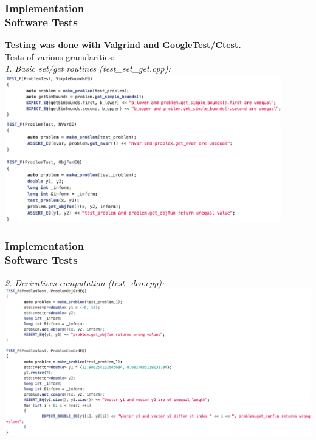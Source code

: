 \documentclass[ucs,10pt]{beamer}
\begin{document}
\begin{frame}
\frametitle{Implementation \\
\small \color{rwth-blue} Software Tests}
\textbf{Testing was done with Valgrind and GoogleTest/Ctest.}\vspace{2ex}\\
\underline{Tests of various granularities:}\vspace{1ex}\\
\textit{1. Basic set/get routines (test\_set\_get.cpp):}
\includegraphics[width=0.9\textwidth]{test1.1.png}
\includegraphics[width=0.9\textwidth]{test1.2.png}
\end{frame}

\begin{frame}
\frametitle{Implementation \\
\small \color{rwth-blue} Software Tests}
\vspace{1em}
\textit{2. Derivatives computation (test\_dco.cpp):}\vspace{1em}
\includegraphics[width=\textwidth]{test2.png}
\end{frame}
\end{document}
